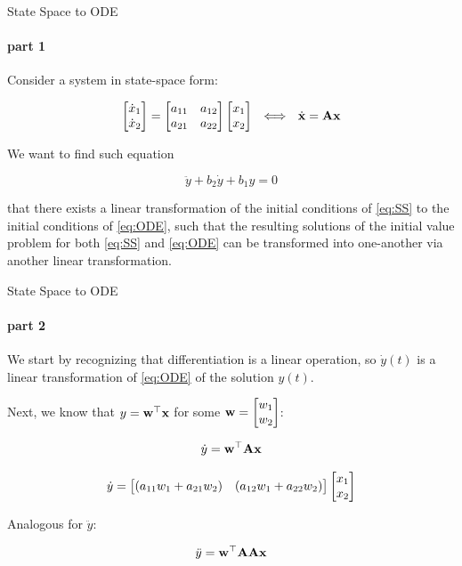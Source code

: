 \documentclass{beamer}
\begin{document}
\begin{frame}{State Space to ODE}
\framesubtitle{part 1}
\begin{flushleft}

Consider a system in state-space form:

\begin{equation}
\label{eq:SS}
\myvec{\dot x_1}{\dot x_2} = 
\ma{a_{11}}{a_{12}}{a_{21}}{a_{22}}
\myvec{x_1}{x_2} \ \ 
\Longleftrightarrow \ \ 
\dx{x} = \bo{A} \bo{x} 
\end{equation}

We want to find such equation 

\begin{equation}
\label{eq:ODE}
\ddot{y} + b_2 \dot{y} + b_1 y = 0
\end{equation}

that there exists a linear transformation of the initial conditions of \eqref{eq:SS} to the initial conditions of \eqref{eq:ODE}, such that the resulting solutions of the initial value problem for both \eqref{eq:SS} and \eqref{eq:ODE} can be transformed into one-another via another linear transformation.


\end{flushleft}
\end{frame}



\begin{frame}{State Space to ODE}
\framesubtitle{part 2}
\begin{flushleft}

We start by recognizing that differentiation is a linear operation, so $\dot{y}(t)$ is a linear transformation of \eqref{eq:ODE} of the solution $y(t)$. 

Next, we know that $y = \mathbf{w}^\top \mathbf{x}$ for some $\mathbf{w} = \begin{bmatrix} w_1 \\ w_2 \end{bmatrix}$:

\begin{equation}
\dot y = \mathbf{w}^\top \mathbf{A} \mathbf{x}
\end{equation}

\begin{equation}
\dot y = \begin{bmatrix} (a_{11}w_1 + a_{21}w_2) & (a_{12}w_1 + a_{22}w_2) \end{bmatrix}
\begin{bmatrix} x_1 \\ x_2 \end{bmatrix}    
\end{equation}

Analogous for $\ddot y$:

\begin{equation}
\ddot y = \mathbf{w}^\top \mathbf{A} \mathbf{A} \mathbf{x}
\end{equation}

\end{flushleft}
\end{frame}
\end{document}
